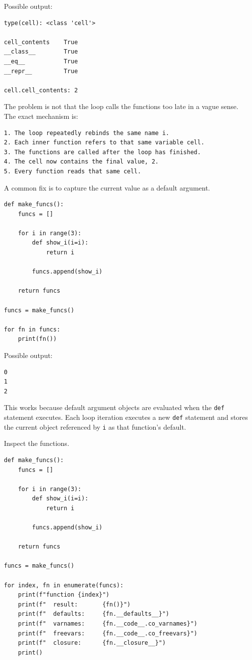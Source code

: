 Possible output:

\begin{verbatim}
type(cell): <class 'cell'>

cell_contents    True
__class__        True
__eq__           True
__repr__         True

cell.cell_contents: 2
\end{verbatim}

The problem is not that the loop calls the functions too late in a vague sense. The exact mechanism is:

\begin{verbatim}
1. The loop repeatedly rebinds the same name i.
2. Each inner function refers to that same variable cell.
3. The functions are called after the loop has finished.
4. The cell now contains the final value, 2.
5. Every function reads that same cell.
\end{verbatim}

A common fix is to capture the current value as a default argument.

\begin{verbatim}
def make_funcs():
    funcs = []

    for i in range(3):
        def show_i(i=i):
            return i

        funcs.append(show_i)

    return funcs

funcs = make_funcs()

for fn in funcs:
    print(fn())
\end{verbatim}

Possible output:

\begin{verbatim}
0
1
2
\end{verbatim}

This works because default argument objects are evaluated when the \texttt{def} statement executes. Each loop iteration executes a new \texttt{def} statement and stores the current object referenced by \texttt{i} as that function's default.

Inspect the functions.

\begin{verbatim}
def make_funcs():
    funcs = []

    for i in range(3):
        def show_i(i=i):
            return i

        funcs.append(show_i)

    return funcs

funcs = make_funcs()

for index, fn in enumerate(funcs):
    print(f"function {index}")
    print(f"  result:       {fn()}")
    print(f"  defaults:     {fn.__defaults__}")
    print(f"  varnames:     {fn.__code__.co_varnames}")
    print(f"  freevars:     {fn.__code__.co_freevars}")
    print(f"  closure:      {fn.__closure__}")
    print()
\end{verbatim}

